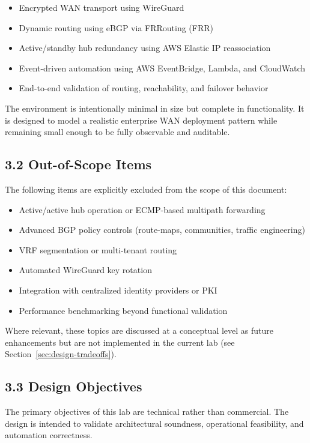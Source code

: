 \documentclass[11pt]{article}
\begin{document}
\begin{itemize}
  \item Encrypted WAN transport using WireGuard
  \item Dynamic routing using eBGP via FRRouting (FRR)
  \item Active/standby hub redundancy using AWS Elastic IP reassociation
  \item Event-driven automation using AWS EventBridge, Lambda, and CloudWatch
  \item End-to-end validation of routing, reachability, and failover behavior
\end{itemize}

The environment is intentionally minimal in size but complete in functionality. It is designed to model a realistic enterprise WAN deployment pattern while remaining small enough to be fully observable and auditable.

\subsection{3.2 Out-of-Scope Items}
\label{sec:out-of-scope}

The following items are explicitly excluded from the scope of this document:

\begin{itemize}
  \item Active/active hub operation or ECMP-based multipath forwarding
  \item Advanced BGP policy controls (route-maps, communities, traffic engineering)
  \item VRF segmentation or multi-tenant routing
  \item Automated WireGuard key rotation
  \item Integration with centralized identity providers or PKI
  \item Performance benchmarking beyond functional validation
\end{itemize}

Where relevant, these topics are discussed at a conceptual level as future enhancements but are not implemented in the current lab (see Section~\ref{sec:design-tradeoffs}).

\subsection{3.3 Design Objectives}
\label{sec:design-objectives}

The primary objectives of this lab are technical rather than commercial. The design is intended to validate architectural soundness, operational feasibility, and automation correctness.
\end{document}
